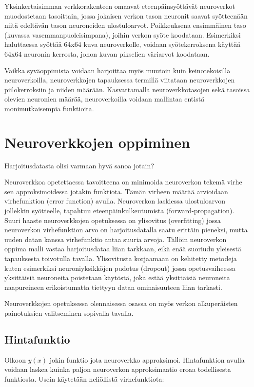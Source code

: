 \documentclass[finnish]{tktltiki2}
\theoremstyle{definition}
\theoremstyle{remark}
\begin{document}
  Yksinkertaisimman verkkorakenteen omaavat eteenpäinsyöttävät neuroverkot muodostetaan tasoittain, jossa jokaisen verkon tason neuronit saavat syötteenään niitä edeltävän tason neuroneiden ulostuloarvot. Poikkeuksena ensimmäinen taso (kuvassa vasemmanpuoleisimpana), joihin verkon syöte koodataan. Esimerkiksi haluttaessa syöttää 64x64 kuva neuroverkolle, voidaan syötekerroksena käyttää 64x64 neuronin kerrosta, johon kuvan pikselien väriarvot koodataan.

  Vaikka syväoppimista voidaan harjoittaa myös muutoin kuin keinotekoisilla neuroverkoilla, neuroverkkojen tapauksessa termillä viitataan neuroverkkojen piilokerroksiin ja niiden määrään. Kasvattamalla neuroverkkotasojen sekä tasoissa olevien neuronien määrää, neuroverkoilla voidaan mallintaa entistä monimutkaisempia funktioita.

  \section{Neuroverkkojen oppiminen}
  Harjoitusdatasta olisi varmaan hyvä sanoa jotain?

  Neuroverkkoa opetettaessa tavoitteena on minimoida neuroverkon tekemä virhe sen approksimoidessa jotakin funktiota. Tämän virheen määrää arvioidaan virhefunktion (error function) avulla. Neuroverkon laskiessa ulostuloarvon jollekkin syötteelle, tapahtuu eteenpäinkulkeutumista (forward-propagation). 
  Suuri haaste neuroverkkojen opetuksessa on ylisovitus (overfitting) jossa neuroverkon virhefunktion arvo on harjoitusdatalla saatu erittäin pieneksi, mutta uuden datan kanssa virhefunktio antaa suuria arvoja. Tällöin neuroverkon oppima malli vastaa harjoitusdataa liian tarkkaan, eikä enää suoriudu yleisestä tapauksesta toivotulla tavalla. Ylisovitusta korjaamaan on kehitetty metodeja kuten esimerkiksi neuroniyksikköjen pudotus (dropout) jossa opetusvaiheessa yksittäisiä neuroneita poistetaan käytöstä, joka estää yksittäisiä neuroneita naapureineen erikoistumatta tiettyyn datan ominaisuuteen liian tarkasti.

  Neuroverkkojen opetuksessa olennaisessa osassa on myös verkon alkuperäisten painotuksien valitseminen sopivalla tavalla.

  \subsection{Hintafunktio}
    Olkoon $y(x)$ jokin funktio jota neuroverkko approksimoi. Hintafunktion avulla voidaan laskea kuinka paljon neuroverkon approksimaatio eroaa todellisesta funktiosta. Usein käytetään neliöllistä virhefunktiota:
\end{document}
